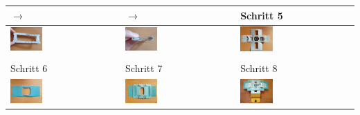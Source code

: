 		\begin{center}
			\begin{tabular}{l|l|l}
				\multicolumn{1}{l}{$\rightarrow$} & $\rightarrow$ & Schritt 5 \\
				\midrule
				\includegraphics[width=0.3\textwidth]{images/aufbau/4_2.jpg} &
				\includegraphics[width=0.3\textwidth]{images/aufbau/4_3.jpg} &
				\includegraphics[width=0.3\textwidth]{images/aufbau/5.jpg} \\
				\multicolumn{3}{l}{} \\[-0.5em]
				Schritt 6 & Schritt 7 & Schritt 8  \\
				\midrule
				\includegraphics[width=0.3\textwidth]{images/aufbau/6.jpg} &
				\includegraphics[width=0.3\textwidth]{images/aufbau/7.jpg} &
				\includegraphics[width=0.3\textwidth]{images/aufbau/8.jpg} \\

\end{tabular}
\end{center}

